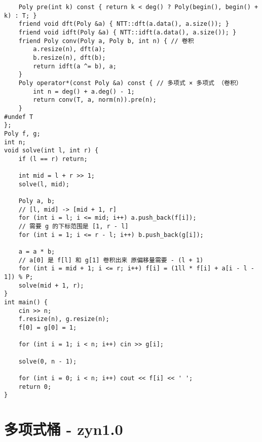\begin{verbatim}
    Poly pre(int k) const { return k < deg() ? Poly(begin(), begin() + k) : T; }
    friend void dft(Poly &a) { NTT::dft(a.data(), a.size()); }
    friend void idft(Poly &a) { NTT::idft(a.data(), a.size()); }
    friend Poly conv(Poly a, Poly b, int n) { // 卷积
        a.resize(n), dft(a);
        b.resize(n), dft(b);
        return idft(a ^= b), a;
    }
    Poly operator*(const Poly &a) const { // 多项式 × 多项式 （卷积）
        int n = deg() + a.deg() - 1;
        return conv(T, a, norm(n)).pre(n);
    }
#undef T
};
Poly f, g;
int n;
void solve(int l, int r) {
    if (l == r) return;

    int mid = l + r >> 1;
    solve(l, mid);

    Poly a, b;
    // [l, mid] -> [mid + 1, r]
    for (int i = l; i <= mid; i++) a.push_back(f[i]);
    // 需要 g 的下标范围是 [1, r - l]
    for (int i = 1; i <= r - l; i++) b.push_back(g[i]);

    a = a * b;
    // a[0] 是 f[l] 和 g[1] 卷积出来 原偏移量需要 - (l + 1)
    for (int i = mid + 1; i <= r; i++) f[i] = (1ll * f[i] + a[i - l - 1]) % P;
    solve(mid + 1, r);
}
int main() {
    cin >> n;
    f.resize(n), g.resize(n);
    f[0] = g[0] = 1;

    for (int i = 1; i < n; i++) cin >> g[i];

    solve(0, n - 1);

    for (int i = 0; i < n; i++) cout << f[i] << ' ';
    return 0;
}
\end{verbatim}

\section{多项式桶 - zyn1.0}

